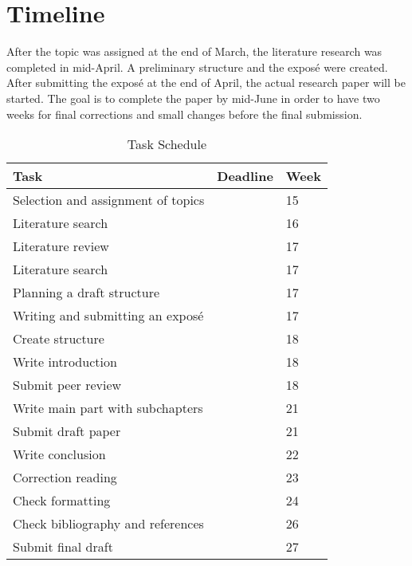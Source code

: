 \chapter{Timeline}
\label{sec:intro:Timeline}
After the topic was assigned at the end of March, the literature research was completed in mid-April. 
A preliminary structure and the exposé were created. After submitting the exposé at the end of April, the actual research paper will be started. 
The goal is to complete the paper by mid-June in order to have two weeks for final 
corrections and small changes before the final submission.
\begin{table}[htbp]
    \centering
    \caption{Task Schedule}
    \label{tab:schedule}
    \begin{tabular}{@{}lll@{}}
        \toprule
        Task                                & Deadline & Week \\ \midrule
        Selection and assignment of topics  &          & 15   \\
        Literature search                   &          & 16   \\
        Literature review                   &          & 17   \\
        Literature search                   &          & 17   \\
        Planning a draft structure         &          & 17   \\
        Writing and submitting an exposé   &          & 17   \\
        Create structure                   &          & 18   \\
        Write introduction                 &          & 18   \\
        Submit peer review                 &          & 18   \\
        Write main part with subchapters   &          & 21   \\
        Submit draft paper                 &          & 21   \\
        Write conclusion                   &          & 22   \\
        Correction reading                 &          & 23   \\
        Check formatting                   &          & 24   \\
        Check bibliography and references  &          & 26   \\
        Submit final draft                 &          & 27   \\ \bottomrule
    \end{tabular}
\end{table}

